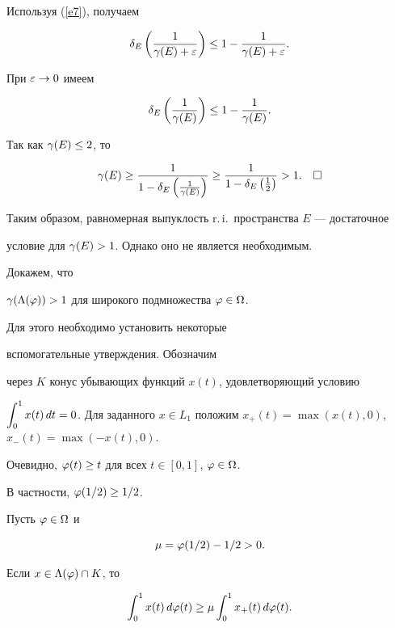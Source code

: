 Используя (\ref{e7}), получаем


$$


\delta_E \left( \frac 1 {\gam(E)+\eps}\right) \le 1 - \frac 1 {\gam(E)+\eps}.


$$


При $\varepsilon\to 0$ имеем 


$$


\delta_E \left( \frac 1 {\gam(E)} \right) \le 1 - \frac 1 {\gam(E)}. 


$$


Так как $\gamma(E) \le 2$, то


$$


\gam(E) \ge \frac 1 {1 - \delta_E \left( \frac 1 {\gam(E)}\right)} \ge 


\frac 1 {1 -\delta_E\left(\frac 1 2 \right) } >1. \quad\square


$$





Таким образом, равномерная выпуклость r.\,i.\ пространства $E$ --- достаточное


условие для $\gamma(E) >1$. Однако оно не является необходимым. 


Докажем, что 


$\gamma(\Lambda (\varphi)) >1$ для широкого подмножества $\varphi\in \Omega$.





Для этого необходимо установить некоторые 


вспомогательные утверждения. Обозначим


через $K$ конус убывающих функций $x(t)$, удовлетворяющий условию


$\intl{0}{1} x(t)\, dt =0$. Для заданного $x\in L_1$ положим $x_+ (t) = \max 


(x(t), 0)$, $x_-(t) = \max (-x(t), 0)$. 





Очевидно, $\varphi(t) \ge t$ для всех $t\in [0,1]$, $\varphi\in \Omega$. 


В частности, $\varphi(1/2) \ge 1/2$. 





\begin{lem}\label{l2}


Пусть $\varphi\in \Omega$ и


$$




\mu = \ph(1/2) - 1/2 >0. 




$$


Если $x\in \Lambda (\varphi) \cap K$, то


$$


\intl{0}{1} x(t) \, d\ph(t) \ge \mu \intl{0}{1} x_+ (t) \, d\ph (t). 


$$


\end{lem}





